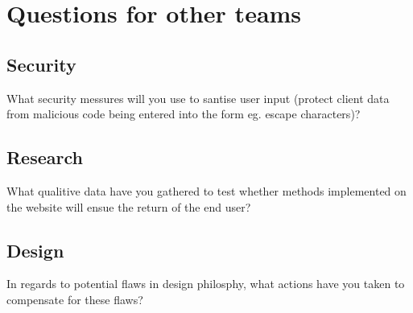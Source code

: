 \documentclass[letterpaper,twoside,12pt]{article}
\begin{document}
 \begin{bchart}[step=15,max=100,width=12cm]
 \end{bchart}

\section{Questions for other teams}

\subsection{ Security}

What security messures will you use to santise user input (protect client data from malicious code being entered into the form eg. escape characters)?

\subsection{Research}

What qualitive data have you gathered to test whether methods implemented on the website will ensue the return of the end user?

\subsection {Design}

In regards to potential flaws in design philosphy, what actions have you taken to compensate for these flaws?



\appendix
\printindex
{}
\printglossaries

\end{document}
